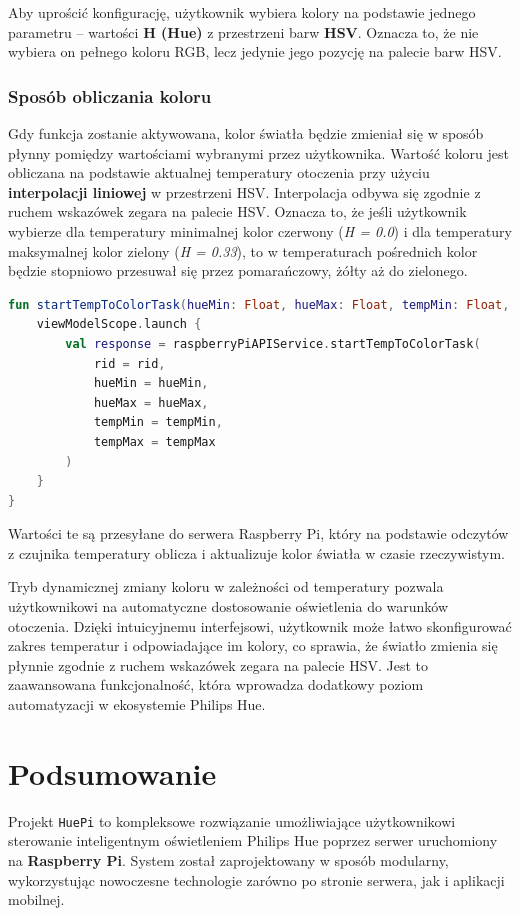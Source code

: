\documentclass[12pt]{article}
\begin{document}
\noindent Aby uprościć konfigurację, użytkownik wybiera kolory na podstawie jednego parametru – wartości \textbf{H (Hue)} z przestrzeni barw \textbf{HSV}. Oznacza to, że nie wybiera on pełnego koloru RGB,
lecz jedynie jego pozycję na palecie barw HSV.

\subsubsection*{Sposób obliczania koloru}
\noindent Gdy funkcja zostanie aktywowana, kolor światła będzie zmieniał się w sposób płynny pomiędzy wartościami wybranymi przez użytkownika. Wartość koloru jest obliczana na podstawie aktualnej
temperatury otoczenia przy użyciu \textbf{interpolacji liniowej} w przestrzeni HSV. Interpolacja odbywa się zgodnie z ruchem wskazówek zegara na palecie HSV. Oznacza to, że jeśli użytkownik wybierze
dla temperatury minimalnej kolor czerwony (\textit{H = 0.0}) i dla temperatury maksymalnej kolor zielony (\textit{H = 0.33}), to w temperaturach pośrednich kolor będzie stopniowo przesuwał się
przez pomarańczowy, żółty aż do zielonego.

\begin{lstlisting}[language=Kotlin]
fun startTempToColorTask(hueMin: Float, hueMax: Float, tempMin: Float, tempMax: Float) {
    viewModelScope.launch {
        val response = raspberryPiAPIService.startTempToColorTask(
            rid = rid,
            hueMin = hueMin,
            hueMax = hueMax,
            tempMin = tempMin,
            tempMax = tempMax
        )
    }
}
\end{lstlisting}

\noindent Wartości te są przesyłane do serwera Raspberry Pi, który na podstawie odczytów z czujnika temperatury oblicza i aktualizuje kolor światła w czasie rzeczywistym.

Tryb dynamicznej zmiany koloru w zależności od temperatury pozwala użytkownikowi na automatyczne dostosowanie oświetlenia do warunków otoczenia. Dzięki intuicyjnemu interfejsowi,
użytkownik może łatwo skonfigurować zakres temperatur i odpowiadające im kolory, co sprawia, że światło zmienia się płynnie zgodnie z ruchem wskazówek zegara na palecie HSV. Jest to
zaawansowana funkcjonalność, która wprowadza dodatkowy poziom automatyzacji w ekosystemie Philips Hue.

\clearpage

\section{Podsumowanie}
Projekt \texttt{HuePi} to kompleksowe rozwiązanie umożliwiające użytkownikowi sterowanie inteligentnym oświetleniem Philips Hue poprzez serwer uruchomiony na \textbf{Raspberry Pi}.
System został zaprojektowany w sposób modularny, wykorzystując nowoczesne technologie zarówno po stronie serwera, jak i aplikacji mobilnej.
\end{document}

